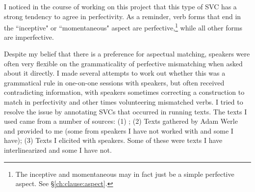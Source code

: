 \begin{comment}
\begin{tikzpicture}[sibling distance=10em,
  every node/.style = {shape=rectangle, align=center}]
\node (aspect) at (0,10) {aspect};
\node (pf) at (1,15) {perfective};
\node (impf) at (1,5) {imperfective};
\node (mo) at (8,15) {momentaneous};
\node (in) at (8,14) {inceptive};
\node (mo-grad-pf) at (8,13) {momentaneous-graduative-perf};
\node (in-grad-pf) at (8,12) {incep-grad-perf};
\node (dr-pf) at (8,11) {durative-perf};
\node (dr-grad-pf) at (8,10) {durative-grad-pf};
\node (rp-pf) at (8,9) {repet-perf};
\node (it-pf) at (8,8) {iter-perf};
\node (ct) at (5,6) {continuative};
\node (dr) at (5,5) {durative};
\node (rp) at (5,4) {repetative};
\node (it) at (5,3) {iterative};
\node (mo-grad) at (5,2) {mo-grad-pf};
\node (in-grad) at (5,1) {in-grad-pf};
\node (dr-grad) at (5,0) {dr-grad-pf};
\draw[->] (aspect) -- (pf);
\draw[->] (aspect) -- (impf);
\draw[->] (pf) -- (mo);
\draw[->] (pf) -- (in);
\draw[->] (pf) -- (mo-grad-pf);
\draw[->] (pf) -- (in-grad-pf);
\draw[->] (pf) -- (dr-pf);
\draw[->] (pf) -- (dr-grad-pf);
\draw[->] (pf) -- (rp-pf);
\draw[->] (pf) -- (it-pf);
\draw[->] (impf) -- (ct);
\draw[->] (impf) -- (dr);
\draw[->] (impf) -- (rp);
\draw[->] (impf) -- (it);
\draw[->] (impf) -- (mo-grad);
\draw[->] (impf) -- (in-grad);
\draw[->] (impf) -- (dr-grad);
\end{tikzpicture}
\end{comment}


I noticed in the course of working on this project that this type of SVC has a strong tendency to agree in perfectivity. As a reminder, verb forms that end in the ``inceptive" or ``momentaneous" aspect are perfective,\footnote{The inceptive and momentaneous may in fact just be a simple perfective aspect. See \S\ref{ch:clause:aspect}.} while all other forms are imperfective.

Despite my belief that there is a preference for aspectual matching, speakers were often very flexible on the grammaticality of perfective mismatching when asked about it directly. I made several attempts to work out whether this was a grammatical rule in one-on-one sessions with speakers, but often received contradicting information, with speakers sometimes correcting a construction to match in perfectivity and other times volunteering mismatched verbs. I tried to resolve the issue by annotating SVCs that occurred in running texts. The texts I used came from a number of sources: (1) \citet{sapir1939}; (2) Texts gathered by Adam Werle and provided to me (some from speakers I have not worked with and some I have); (3) Texts I elicited with speakers. Some of these were texts I have interlinearized and some I have not.

